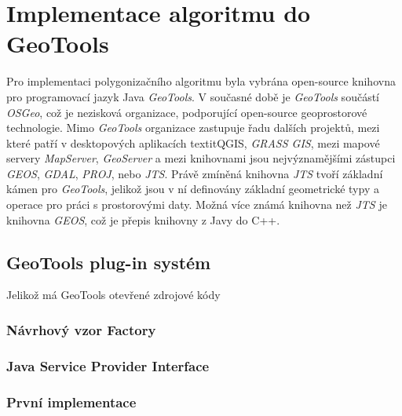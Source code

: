 \chapter{Implementace algoritmu do GeoTools}
\label{chap:implementacealgoritmudogeotools}
	Pro implementaci polygonizačního algoritmu byla vybrána open-source knihovna pro programovací jazyk Java \textit{GeoTools}. V současné době je \textit{GeoTools} součástí \textit{OSGeo}, což je nezisková organizace, podporující open-source geoprostorové technologie. Mimo \textit{GeoTools} organizace zastupuje řadu dalších projektů, mezi které patří v desktopových aplikacích textit{QGIS}, \textit{GRASS GIS}, mezi mapové servery \textit{MapServer}, \textit{GeoServer} a mezi knihovnami jsou nejvýznamějšími zástupci \textit{GEOS}, \textit{GDAL}, \textit{PROJ}, nebo \textit{JTS}. Právě zmíněná knihovna \textit{JTS} tvoří základní kámen pro \textit{GeoTools}, jelikož jsou v ní definovány základní geometrické typy a operace pro práci s prostorovými daty. Možná více známá knihovna než \textit{JTS} je knihovna \textit{GEOS}, což je přepis knihovny z Javy do C++. \cite{OSGeo} \cite{GeoTools}
	
\section{GeoTools plug-in systém}
	Jelikož má GeoTools otevřené zdrojové kódy 



\subsection{Návrhový vzor Factory}

\subsection{Java Service Provider Interface}

\subsection{První implementace}

	

